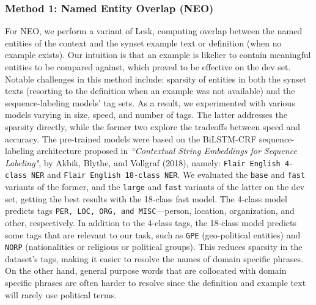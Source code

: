 \documentclass[11pt]{article}
\begin{document}
\subsubsection{Method 1: Named Entity Overlap (NEO)}
For NEO, we perform a variant of Lesk, computing overlap between the named entities of 
the context and the synset example text or definition (when no example exists).
Our intuition is that an example is likelier to contain meaningful entities to be compared against,
which proved to be effective on the dev set. Notable challenges in 
this method include: sparsity of entities in both the synset texts 
(resorting to the definition when an example was not available) and the sequence-labeling models' tag sets. 
As a result, we experimented with various models varying in size, speed, and number of tags. 
The latter addresses the sparsity directly, while the former two explore the tradeoffs between speed and accuracy. 
The pre-trained models were based on the BiLSTM-CRF sequence-labeling architecture proposed in 
\textit{``Contextual String Embeddings for Sequence Labeling"}, 
by Akbik, Blythe, and Vollgraf (2018), namely: \texttt{Flair English 4-class NER} and \texttt{Flair English 18-class NER}.
We evaluated the \texttt{base} and \texttt{fast} variants of the former, and the \texttt{large} and \texttt{fast} variants of the latter on the dev set, 
getting the best results with the 18-class fast model. The 4-class model predicts tags \texttt{PER, LOC, ORG, and MISC}---person, location, organization, and other, respectively. 
In addition to the 4-class tags, the 18-class model predicts some tags that are relevant to our task, such as \texttt{GPE} (geo-political entities) and \texttt{NORP} (nationalities or 
religious or political groups). This reduces sparsity in the dataset's tags, making it easier to resolve the names of domain specific phrases. On the other hand,
general purpose words that are collocated with domain specific phrases are often harder to resolve since
the definition and example text will rarely use political terms.
\end{document}
